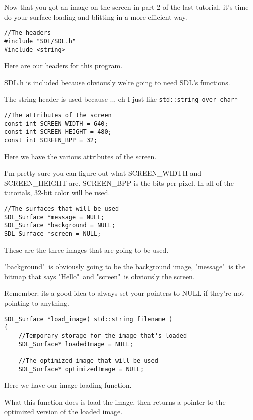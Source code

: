 
Now that you got an image on the screen in part 2 of the last tutorial, it's
time do your surface loading and blitting in a more efficient way.

\begin{verbatim}
//The headers
#include "SDL/SDL.h"
#include <string>
\end{verbatim}

Here are our headers for this program.

SDL.h is included because obviously we're going to need SDL's functions.

The string header is used because ... eh I just like 
\verb|std::string over char*|

\begin{verbatim}
//The attributes of the screen
const int SCREEN_WIDTH = 640;
const int SCREEN_HEIGHT = 480;
const int SCREEN_BPP = 32;
\end{verbatim}

Here we have the various attributes of the screen.

I'm pretty sure you can figure out what SCREEN\_WIDTH and SCREEN\_HEIGHT are.
SCREEN\_BPP is the bits per-pixel. In all of the tutorials, 32-bit color will be
used.

\begin{verbatim}
//The surfaces that will be used
SDL_Surface *message = NULL;
SDL_Surface *background = NULL;
SDL_Surface *screen = NULL;
\end{verbatim}

These are the three images that are going to be used.

"background"\ is obviously going to be the background image, "message"\ is the
bitmap that says "Hello"\ and "screen"\ is obviously the screen.

Remember: its a good idea to always set your pointers to NULL if they're not
pointing to anything.

\begin{verbatim}
SDL_Surface *load_image( std::string filename )
{
    //Temporary storage for the image that's loaded
    SDL_Surface* loadedImage = NULL;

    //The optimized image that will be used
    SDL_Surface* optimizedImage = NULL;
\end{verbatim}

Here we have our image loading function.

What this function does is load the image, then returns a pointer to the
optimized version of the loaded image.


